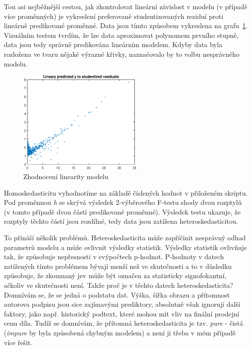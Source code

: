 Tou asi nejběžnější cestou, jak zkontrolovat lineární závislost v modelu (v případě více proměnných) je vykreslení preferovaně studentizovaných reziduí proti lineárně predikované proměnné.
Data jsou tímto způsobem vykreslena na grafu~\ref{fig:lr4}.
Vizuálním testem tvrdím, že lze data aproximovat polynomem prvního stupně, data jsou tedy správně predikována lineárním modelem.
Kdyby data byla rozložena ve tvaru nějaké výrazné křivky, naznačovalo by to volbu nesprávného modelu.

\begin{figure}[htb]
    \centering
    \includegraphics[width=0.55\textwidth]{graphs/fig4.eps}
    \caption{Zhodnocení linearity modelu}
    \label{fig:lr4}
\end{figure}
\FloatBarrier

Homoskedasticitu vyhodnotíme na základě číslených hodnot v přiloženém skriptu.
Pod proměnnou \textit{h} se skrývá výsledek 2-výběrového F-testu shody dvou rozptylů (v tomto případě dvou částí predikované proměnné).
Výsledek testu ukazuje, že rozptyly těchto částí jsou rozdílné, tedy data jsou zatížena heteroskedasticitou.

To přináší několik problémů.
Heteroskedasticita může zapříčinit nesprávný odhad parametrů modelu a může ovlivnit výsledky statistik.
Výsledky statistik ovlivňuje tak, že způsobuje nepřesnosti v evýpočtech p-hodnot.
P-hodnoty v datech zatížených tímto problémem bývají menší než ve skutečnosti a to v důsledku způsobuje, že zkoumaný jev může být označen za statisticky signofokantní, ačkoliv ve skutečnosti není.
Takže proč je v těchto datech heteroskedasticita?
Domnívám se, že se jedná o podstatu dat.
Výška, šířka obrazu a přítomnost autorova podpisu jsou sice zajímavými prediktory, absolutně však ignorují další faktory, jako např. historický podtext, které mohou mít vliv na finální prodejní cenu díla.
Tudíž se domnívám, že přítomná heteroskedasticita je tzv. \textit{pure} - čistá (\textit{impure} by byla způsobená chybným modelem) a není ji třeba v mém případě více řešit.

